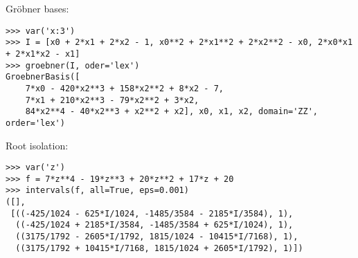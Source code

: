 \noindent Gröbner bases:
\begin{verbatim}
>>> var('x:3')
>>> I = [x0 + 2*x1 + 2*x2 - 1, x0**2 + 2*x1**2 + 2*x2**2 - x0, 2*x0*x1 + 2*x1*x2 - x1]
>>> groebner(I, oder='lex')
GroebnerBasis([
    7*x0 - 420*x2**3 + 158*x2**2 + 8*x2 - 7,
    7*x1 + 210*x2**3 - 79*x2**2 + 3*x2,
    84*x2**4 - 40*x2**3 + x2**2 + x2], x0, x1, x2, domain='ZZ', order='lex')
\end{verbatim}

\noindent Root isolation:
\begin{verbatim}
>>> var('z')
>>> f = 7*z**4 - 19*z**3 + 20*z**2 + 17*z + 20
>>> intervals(f, all=True, eps=0.001)
([],
 [((-425/1024 - 625*I/1024, -1485/3584 - 2185*I/3584), 1),
  ((-425/1024 + 2185*I/3584, -1485/3584 + 625*I/1024), 1),
  ((3175/1792 - 2605*I/1792, 1815/1024 - 10415*I/7168), 1),
  ((3175/1792 + 10415*I/7168, 1815/1024 + 2605*I/1792), 1)])
\end{verbatim}
